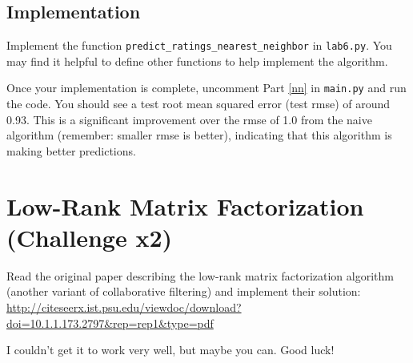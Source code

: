 \documentclass{article}
\begin{document}
\subsection{Implementation}

Implement the function \texttt{predict\_ratings\_nearest\_neighbor} in \texttt{lab6.py}. You may find it helpful to define other functions to help implement the algorithm.

Once your implementation is complete, uncomment Part \ref{nn} in \texttt{main.py} and run the code. You should see a test root mean squared error (test rmse) of around 0.93. This is a significant improvement over the rmse of 1.0 from the naive algorithm (remember: smaller rmse is better), indicating that this algorithm is making better predictions.

\section{Low-Rank Matrix Factorization (Challenge x2)} \label{lr}

Read the original paper describing the low-rank matrix factorization algorithm (another variant of collaborative filtering) and implement their solution: \url{http://citeseerx.ist.psu.edu/viewdoc/download?doi=10.1.1.173.2797&rep=rep1&type=pdf}

I couldn't get it to work very well, but maybe you can. Good luck!
\end{document}
